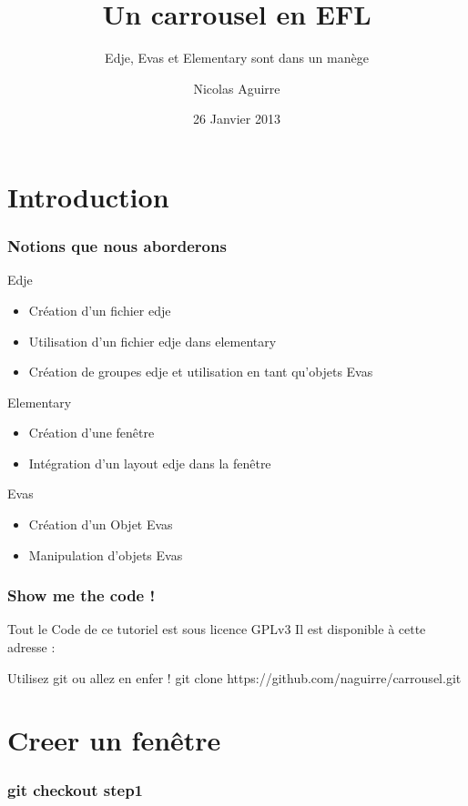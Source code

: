 \documentclass[12pt]{beamer}
\title{Un carrousel en EFL}
\subtitle{Edje, Evas et Elementary sont dans un manège}
\author{Nicolas Aguirre}
\date{26 Janvier 2013}
\begin{document}
\frame{\titlepage}

\section{Introduction}
\begin{frame}
  \frametitle{Notions que nous aborderons}
  \begin{block}{Edje}
  \begin{itemize}
    \item<2-> Création d'un fichier edje
    \item<3-> Utilisation d'un fichier edje dans elementary
    \item<4-> Création de groupes edje et utilisation en tant qu'objets Evas
  \end{itemize}
  \end{block}

  \begin{block}{Elementary}
  \begin{itemize}
    \item<5-> Création d'une fenêtre
    \item<6-> Intégration d'un layout edje dans la fenêtre
  \end{itemize}
  \end{block}

  \begin{block}{Evas}
  \begin{itemize}
    \item<7-> Création d'un Objet Evas
    \item<8-> Manipulation d'objets Evas
  \end{itemize}
  \end{block}

\end{frame}

\begin{frame}
  \frametitle{Show me the code !}
  Tout le Code de ce tutoriel est sous licence GPLv3
  Il est disponible à cette adresse :
  \begin{block}{Utilisez git ou allez en enfer !}
    git clone https://github.com/naguirre/carrousel.git
  \end{block}
\end{frame}

\section{Creer un fenêtre}

\begin{frame}
  \frametitle{git checkout step1}
  \begin{lstlisting}
 
  \end{lstlisting}
\end{frame}
\end{document}
